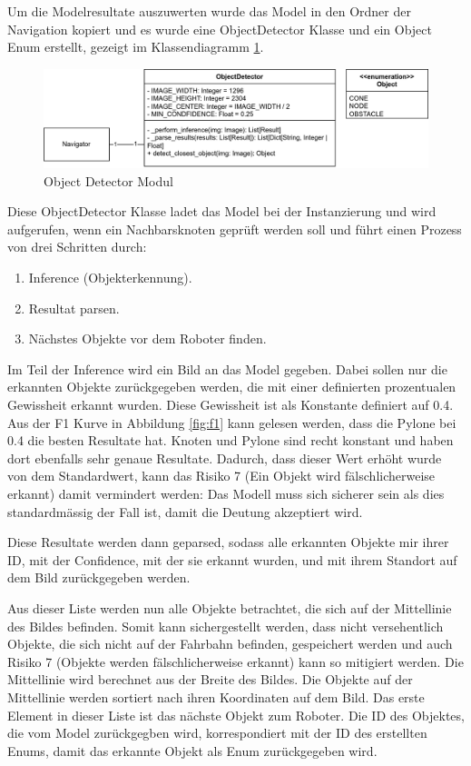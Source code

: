 Um die Modelresultate auszuwerten wurde das Model in den Ordner der Navigation kopiert und es wurde eine ObjectDetector Klasse und ein Object Enum erstellt, gezeigt im Klassendiagramm \ref{fig:nav-object-detector}.

 \begin{figure}[H]
\centering
\includegraphics[width= \textwidth ]{assets/IT/robot-sw-architecture-object-detector.png}
\caption{Object Detector Modul}
\label{fig:nav-object-detector}
\end{figure}

Diese ObjectDetector Klasse ladet das Model bei der Instanzierung und wird aufgerufen, wenn ein Nachbarsknoten geprüft werden soll und führt einen Prozess von drei Schritten durch:

\begin{enumerate}
    \item Inference (Objekterkennung).
    \item Resultat parsen.
    \item Nächstes Objekte vor dem Roboter finden.
\end{enumerate}

Im Teil der Inference wird ein Bild an das Model gegeben. Dabei sollen nur die erkannten Objekte zurückgegeben werden, die mit einer definierten prozentualen Gewissheit erkannt wurden. Diese Gewissheit ist als Konstante definiert auf 0.4. Aus der F1 Kurve in Abbildung \ref{fig:f1} kann gelesen werden, dass die Pylone bei 0.4 die besten Resultate hat. Knoten und Pylone sind recht konstant und haben dort ebenfalls sehr genaue Resultate. Dadurch, dass dieser Wert erhöht wurde von dem Standardwert, kann das Risiko 7 (Ein Objekt wird fälschlicherweise erkannt) damit vermindert werden: Das Modell muss sich sicherer sein als dies standardmässig der Fall ist, damit die Deutung akzeptiert wird.

Diese Resultate werden dann geparsed, sodass alle erkannten Objekte mir ihrer ID, mit der Confidence, mit der sie erkannt wurden, und mit ihrem Standort auf dem Bild zurückgegeben werden.

Aus dieser Liste werden nun alle Objekte betrachtet, die sich auf der Mittellinie des Bildes befinden. Somit kann sichergestellt werden, dass nicht versehentlich Objekte, die sich nicht auf der Fahrbahn befinden, gespeichert werden und auch Risiko 7 (Objekte werden fälschlicherweise erkannt) kann so mitigiert werden. Die Mittellinie wird berechnet aus der Breite des Bildes. Die Objekte auf der Mittellinie werden sortiert nach ihren Koordinaten auf dem Bild. Das erste Element in dieser Liste ist das nächste Objekt zum Roboter. Die ID des Objektes, die vom Model zurückgegben wird, korrespondiert mit der ID des erstellten Enums, damit das erkannte Objekt als Enum zurückgegeben wird.

